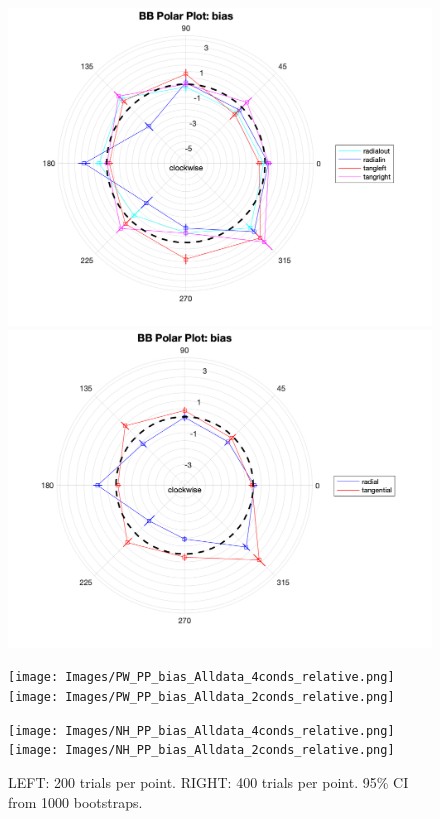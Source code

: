 \documentclass[11pt]{article} %
\begin{document}
\begin{figure}[H]
\centering %
\includegraphics[scale=.3]{Images/BB_PP_bias_Alldata_4conds.png}
\includegraphics[scale=.3]{Images/BB_PP_bias_Alldata_2conds.png}
\end{figure}
\begin{figure}[H]
\centering %
\texttt{[image: Images/PW\_PP\_bias\_Alldata\_4conds\_relative.png]}
\texttt{[image: Images/PW\_PP\_bias\_Alldata\_2conds\_relative.png]}
\end{figure}
\begin{figure}[H]
\centering %
\texttt{[image: Images/NH\_PP\_bias\_Alldata\_4conds\_relative.png]}
\texttt{[image: Images/NH\_PP\_bias\_Alldata\_2conds\_relative.png]}
\caption{LEFT: 200 trials per point. RIGHT: 400 trials per point. 95\% CI from 1000 bootstraps.}
\end{figure}
\end{document}
